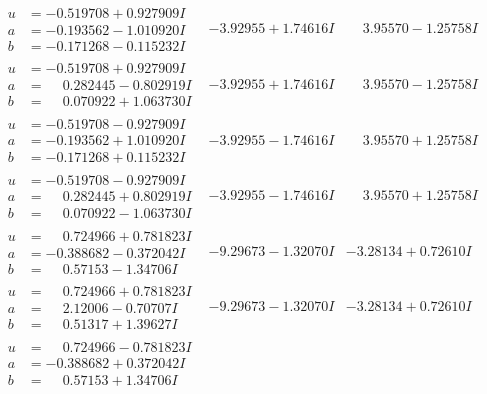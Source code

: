 \documentclass[1p]{elsarticle_modified}
\theoremstyle{definition}
\begin{document}
$$\begin{array}{c|c|c}
\begin{aligned}
u &= -0.519708 + 0.927909 I \\
a &= -0.193562 - 1.010920 I \\
b &= -0.171268 - 0.115232 I\end{aligned}
 & -3.92955 + 1.74616 I & \phantom{-}3.95570 - 1.25758 I \\ \hline\begin{aligned}
u &= -0.519708 + 0.927909 I \\
a &= \phantom{-}0.282445 - 0.802919 I \\
b &= \phantom{-}0.070922 + 1.063730 I\end{aligned}
 & -3.92955 + 1.74616 I & \phantom{-}3.95570 - 1.25758 I \\ \hline\begin{aligned}
u &= -0.519708 - 0.927909 I \\
a &= -0.193562 + 1.010920 I \\
b &= -0.171268 + 0.115232 I\end{aligned}
 & -3.92955 - 1.74616 I & \phantom{-}3.95570 + 1.25758 I \\ \hline\begin{aligned}
u &= -0.519708 - 0.927909 I \\
a &= \phantom{-}0.282445 + 0.802919 I \\
b &= \phantom{-}0.070922 - 1.063730 I\end{aligned}
 & -3.92955 - 1.74616 I & \phantom{-}3.95570 + 1.25758 I \\ \hline\begin{aligned}
u &= \phantom{-}0.724966 + 0.781823 I \\
a &= -0.388682 - 0.372042 I \\
b &= \phantom{-}0.57153 - 1.34706 I\end{aligned}
 & -9.29673 - 1.32070 I & -3.28134 + 0.72610 I \\ \hline\begin{aligned}
u &= \phantom{-}0.724966 + 0.781823 I \\
a &= \phantom{-}2.12006 - 0.70707 I \\
b &= \phantom{-}0.51317 + 1.39627 I\end{aligned}
 & -9.29673 - 1.32070 I & -3.28134 + 0.72610 I \\ \hline\begin{aligned}
u &= \phantom{-}0.724966 - 0.781823 I \\
a &= -0.388682 + 0.372042 I \\
b &= \phantom{-}0.57153 + 1.34706 I\end{aligned}

\end{array}$$
\end{document}
